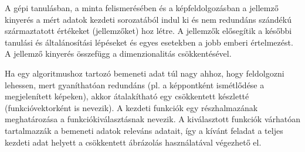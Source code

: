 




A gépi tanulásban, a minta felismerésében és a képfeldolgozásban a jellemző kinyerés a mért adatok kezdeti sorozatából indul ki és nem redundáns szándékú származtatott értékeket (jellemzőket) hoz létre. A jellemzők elősegítik a későbbi tanulási és általánosítási lépéseket és egyes esetekben a jobb emberi értelmezést. A jellemző kinyerés\cite{features27:online} összefügg a dimenzionalitás csökkentésével.

Ha egy algoritmushoz tartozó bemeneti adat túl nagy ahhoz, hogy feldolgozni lehessen, mert gyaníthatóan redundáns (pl. a képpontként ismétlődése a megjelenített képeken), akkor átalakítható egy csökkentett készletté (funkcióvektorként is nevezik). A kezdeti funkciók egy részhalmazának meghatározása a funkciókiválasztásnak nevezik. A kiválasztott funkciók várhatóan tartalmazzák a bemeneti adatok releváns adatait, így a kívánt feladat a teljes kezdeti adat helyett a csökkentett ábrázolás használatával végezhető el.

